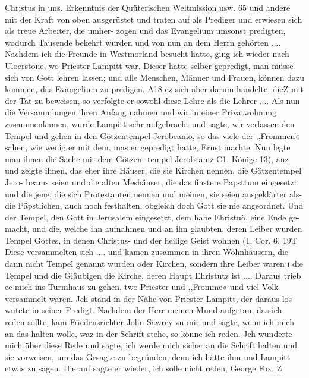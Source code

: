 Christus in uns. Erkenntnis der Quüterischen Weltmission usw. 65
und andere mit der Kraft von oben ausgerüstet und traten auf
als Prediger und erwiesen sich als treue Arbeiter, die umher-
zogen und das Evangelium umsonst predigten, wodurch Tausende
bekehrt wurden und von nun an dem Herrn gehörten ....
Nachdem ich die Freunde in Westmorland besucht hatte, ging
ich wieder nach Uloerstone, wo Priester Lampitt war. Dieser
hatte selber gepredigt, man müsse sich von Gott lehren lassen;
und alle Menschen, Männer und Frauen, können dazu kommen,
das Evangelium zu predigen. A18 ez sich aber darum handelte,
dieZ mit der Tat zu beweisen, so verfolgte er sowohl diese Lehre
als die Lehrer .... Als nun die Versammlungen ihren Anfang
nahmen und wir in einer Privatwohnung zusammenkamen, wurde
Lampitt sehr aufgebracht und sagte, wir verlassen den Tempel
und gehen in den Götzentempel Jerobeamö, so das viele der
,,Frommen« sahen, wie wenig er mit dem, mas er gepredigt hatte,
Ernst machte. Nun legte man ihnen die Sache mit dem Götzen-
tempel Jerobeamz C1. Könige 13), auz und zeigte ihnen, das
eher ihre Häuser, die sie Kirchen nennen, die Götzentempel Jero-
beams seien und die alten Meshäuser, die das finstere Papsttum
eingesetzt und die jene, die sich Protestanten nennen und meinen,
sie seien ausgeklärter als- die Päpstlichen, auch noch festhalten,
obgleich doch Gott sie nie angeordnet. Und der Tempel, den
Gott in Jerusalem eingesetzt, dem habe Ehristuö. eine Ende ge-
macht, und die, welche ihn aufnahmen und an ihn glaubten, deren
Leiber wurden Tempel Gottes, in denen Christus- und der heilige
Geist wohnen (1. Cor. 6, 19T Diese versammelten sich ....
und kamen zusammen in ihren Wohnhäusern, die dann nicht
Tempel genannt wurden oder Kirchen, sondern ihre Leiber waren
i die Tempel und die Gläubigen die Kirche, deren Haupt Ehristutz
ist .... Daraus trieb ee mich ins Turmhaus zu gehen, two Priester
und ,,Fromme« und viel Volk versammelt waren. Jch stand in der
Nähe von Priester Lampitt, der daraus los wütete in seiner
Predigt. Nachdem der Herr meinen Mund aufgetan, das ich
reden sollte, kam Friedensrichter John Sawrey zu mir und sagte,
wenn ich mich an das halten wolle, waz in der Schrift stehe,
so könne ich reden. Jch wunderte mich über diese Rede und sagte,
ich werde mich sicher an die Schrift halten und sie vorweisen,
um das Gesagte zu begründen; denn ich hätte ihm und Lampitt
etwas zu sagen. Hierauf sagte er wieder, ich solle nicht reden,
George Fox. Z


